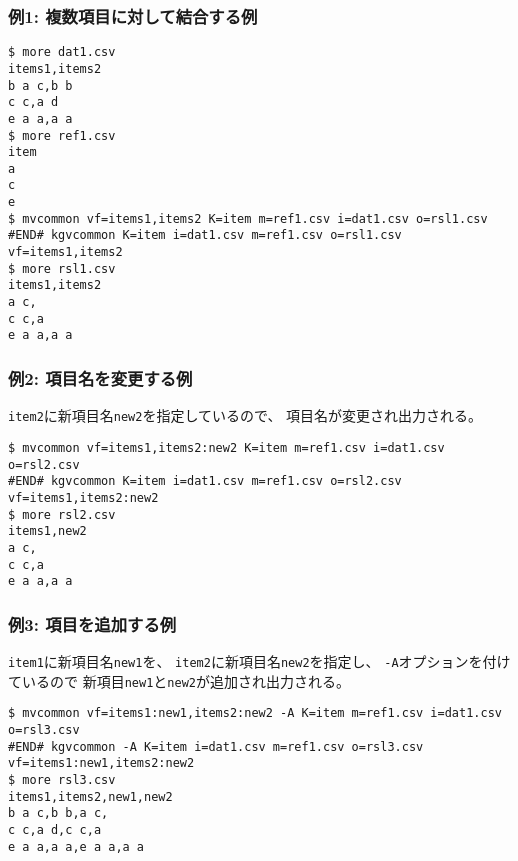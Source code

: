 \subsubsection*{例1: 複数項目に対して結合する例}



\begin{Verbatim}[baselinestretch=0.7,frame=single]
$ more dat1.csv
items1,items2
b a c,b b
c c,a d
e a a,a a
$ more ref1.csv
item
a
c
e
$ mvcommon vf=items1,items2 K=item m=ref1.csv i=dat1.csv o=rsl1.csv
#END# kgvcommon K=item i=dat1.csv m=ref1.csv o=rsl1.csv vf=items1,items2
$ more rsl1.csv
items1,items2
a c,
c c,a
e a a,a a
\end{Verbatim}
\subsubsection*{例2: 項目名を変更する例}

\verb|item2|に新項目名\verb|new2|を指定しているので、
項目名が変更され出力される。


\begin{Verbatim}[baselinestretch=0.7,frame=single]
$ mvcommon vf=items1,items2:new2 K=item m=ref1.csv i=dat1.csv o=rsl2.csv
#END# kgvcommon K=item i=dat1.csv m=ref1.csv o=rsl2.csv vf=items1,items2:new2
$ more rsl2.csv
items1,new2
a c,
c c,a
e a a,a a
\end{Verbatim}
\subsubsection*{例3: 項目を追加する例}

\verb|item1|に新項目名\verb|new1|を、
\verb|item2|に新項目名\verb|new2|を指定し、
\verb|-A|オプションを付けているので
新項目\verb|new1|と\verb|new2|が追加され出力される。


\begin{Verbatim}[baselinestretch=0.7,frame=single]
$ mvcommon vf=items1:new1,items2:new2 -A K=item m=ref1.csv i=dat1.csv o=rsl3.csv
#END# kgvcommon -A K=item i=dat1.csv m=ref1.csv o=rsl3.csv vf=items1:new1,items2:new2
$ more rsl3.csv
items1,items2,new1,new2
b a c,b b,a c,
c c,a d,c c,a
e a a,a a,e a a,a a
\end{Verbatim}
